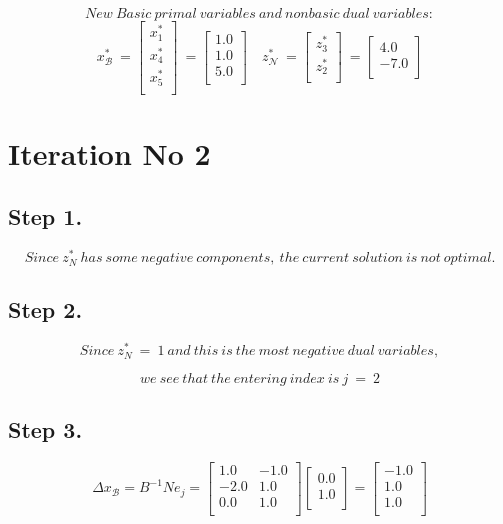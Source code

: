 \documentclass [12pt] {article}
\begin{document}
\[
New\ Basic\ primal\ variables\ and\ nonbasic\ dual\ variables:
\]
\[
x_{\mathcal B}^{*}\ =\begin{bmatrix}
x_{1}^{*} \\x_{4}^{*} \\x_{5}^{*} \\
\end{bmatrix}\ =\begin{bmatrix}
1.0 \\ 1.0 \\ 5.0 \\ 
\end{bmatrix}\quad
z_{\mathcal N}^{*}\ =\begin{bmatrix}
z_{3}^{*} \\z_{2}^{*} \\
\end{bmatrix}\ =\begin{bmatrix}
4.0 \\ -7.0 \\ 
\end{bmatrix}
\]
\section*{Iteration No 2}
\subsection{Step 1.}
\[
Since\ z_\mathit{N}^*\ has\ some\ negative\ components,\ the\ current\ solution\ is\ not\ optimal.
\]
\subsection{Step 2.}
\[
Since\ z_\mathit{N}^*\ = \ 1\ and\ this\ is\ the\ most\ negative\ dual\ variables,
\]

\[
we\ see\ that\ the\ entering\ index\ is\  j\ =\ 2
\]
\subsection{Step 3.}
\[
\Delta x_{\mathcal B} = B^{-1} N e_j =
\begin{bmatrix}
1.0 & -1.0 \\ -2.0 & 1.0 \\ 0.0 & 1.0 \\ 
\end{bmatrix}
\begin{bmatrix}
0.0 \\ 1.0 \\ 
\end{bmatrix}
= \begin{bmatrix}
-1.0 \\ 1.0 \\ 1.0 \\ 
\end{bmatrix}
\]
\end{document}
